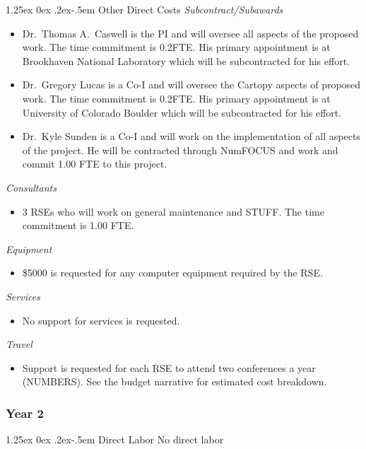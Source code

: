 \documentclass[12pt]{article}
\makeatletter
\numberwithin{page}{section}
\renewcommand{\paragraph}{%
  \@startsection{paragraph}{4}%
  {\z@}{1.25ex \@plus 0ex \@minus .2ex}{-.5em}%
  {\normalfont\normalsize\itshape\bfseries}%
}
\makeatother
\begin{document}
\paragraph{Other Direct Costs}
\textit{Subcontract/Subawards}
\begin{itemize}
  \item Dr.\ Thomas A.\ Caswell is the PI and will oversee all aspects of the
  proposed work.  The time commitment is 0.2FTE.  His primary
  appointment is at Brookhaven National Laboratory which will be
  subcontracted for his effort.
\item Dr.\ Gregory Lucas is a Co-I and will oversee the Cartopy aspects of
  proposed work.  The time commitment is 0.2FTE.  His primary appointment is at
  University of Colorado Boulder which will be subcontracted for his effort.
\item Dr.\ Kyle Sunden is a Co-I and will work on the implementation of all
  aspects of the project.  He will be contracted through NumFOCUS and work and
  commit 1.00 FTE to this project.
\end{itemize}
\textit{Consultants}
\begin{itemize}
\item 3 RSEs who will work on general maintenance and STUFF.  The time commitment is 1.00
  FTE.
\end{itemize}
\textit{Equipment}
\begin{itemize}
\item \$5000 is requested for any computer equipment required by the RSE.
\end{itemize}
\textit{Services}
\begin{itemize}
\item No support for services is requested.
\end{itemize}
\textit{Travel}
\begin{itemize}
\item Support is requested for each RSE to attend two conferences a
  year (NUMBERS).  See the budget narrative for estimated cost
  breakdown.
\end{itemize}
\subsubsection{Year 2}
\paragraph{Direct Labor}
No direct labor
\end{document}
